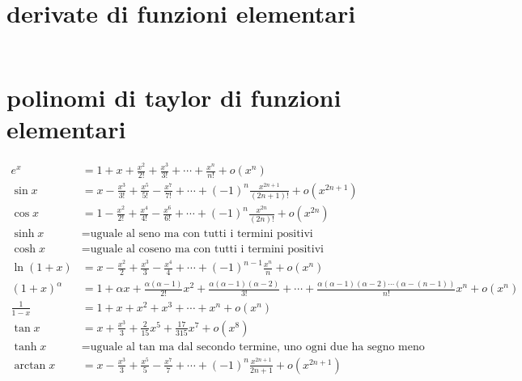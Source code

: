 \documentclass{article}
\begin{document}
\section{derivate di funzioni elementari}

\begin{align*}
\end{align*}

\section{polinomi di taylor di funzioni elementari}

\begin{align*}
e^x &=1+x+\frac{x^2}{2!}+\frac{x^3}{3!}+\cdots+\frac{x^n}{n!}+o(x^n)\\
\sin x&= x-\frac{x^3}{3!}+\frac{x^5}{5!}-\frac{x^7}{7!}+\cdots+(-1)^n\frac{x^{2n+1}}{(2n+1)!}+o\left(x^{2n+1}\right)\\
\cos x&= 1-\frac{x^2}{2!}+\frac{x^4}{4!}-\frac{x^6}{6!}+\cdots+(-1)^n\frac{x^{2n}}{(2n)!}+o\left(x^{2n}\right)\\
\sinh x &= \text{uguale al seno ma con tutti i termini positivi}\\
\cosh x &= \text{uguale al coseno ma con tutti i termini positivi}\\
\ln(1+x) &=x-\frac{x^2}{2}+\frac{x^3}{3}-\frac{x^4}{4}+\cdots+(-1)^{n-1}\frac{x^n}{n}+o(x^n)\\
(1+x)^\alpha &=1+\alpha x+\frac{\alpha (\alpha -1)}{2!}x^2+\frac{\alpha(\alpha-1)(\alpha-2)}{3!}+\cdots+\frac{\alpha(\alpha-1)(\alpha-2)\cdots(\alpha-(n-1))}{n!}x^n+o(x^n)\\
\frac{1}{1-x} &= 1+x+x^2+x^3+\cdots+x^n+o(x^n)\\
\tan x &= x+\frac{x^3}{3}+\frac{2}{15}x^5+\frac{17}{315}x^7+o(x^8)\\
\tanh x &= \text{uguale al tan ma dal secondo termine, uno ogni due ha segno meno}\\
\arctan x &= x-\frac{x^3}{3}+\frac{x^5}{5}-\frac{x^7}{7}+\cdots+(-1)^n\frac{x^{2n+1}}{2n+1}+o\left(x^{2n+1}\right)
\end{align*}
\end{document}
